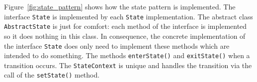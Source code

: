 \documentclass[fontsize=12pt,
               paper=a4,
               twoside=false,
               parskip=half,
               ]{scrartcl}
\begin{document}
Figure~\ref{fig:state_pattern} shows how the state pattern is implemented. The interface \texttt{State} is implemented by each \texttt{State} implementation. The abstract class \texttt{AbstractState} is just for comfort: each method of the interface is implemented so it does nothing in this class. In consequence, the concrete implementation of the interface \texttt{State} does only need to implement these methods which are intended to do something. The methods \texttt{enterState()} and \texttt{exitState()} when a transition occurs. The \texttt{StateContext} is unique and handles the transition via the call of the \texttt{setState()} method.
\end{document}
